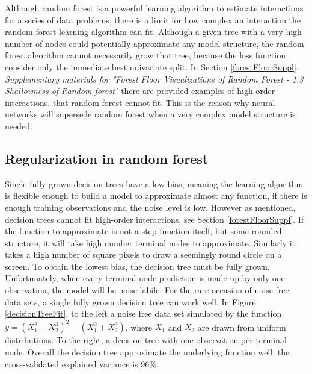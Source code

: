 Although random forest is a powerful learning algorithm to estimate interactions for a series of data problems, there is a limit for how complex an interaction the random forest learning algorithm can fit. Although a given tree with a very high number of nodes could potentially approximate any model structure, the random forest algorithm cannot necessarily grow that tree, because the loss function consider only the immediate best univariate split. In Section \ref{forestFloorSuppl}, \textit{Supplementary materials for "Forest Floor Visualizations of Random Forest - 1.3 Shallowness of Random forest"} there are provided examples of high-order interactions, that random forest cannot fit. This is the reason why neural networks will supersede random forest when a very complex model structure is needed.

\subsection{Regularization in random forest}
Single fully grown decision trees have a low bias, meaning the learning algorithm is flexible enough to build a model to approximate almost any function, if there is enough training observations and the noise level is low. However as mentioned, decision trees cannot fit high-order interactions, see Section \ref{forestFloorSuppl}. If the function to approximate is not a step function itself, but some rounded structure, it will take high number terminal nodes to approximate. Similarly it takes a high number of square pixels to draw a seemingly round circle on a screen. To obtain the lowest bias, the decision tree must be fully grown. Unfortunately, when every terminal node prediction is made up by only one observation, the model will be noise labile. For the rare occasion of noise free data sets, a single fully grown decision tree can work well. In Figure \ref{decisionTreeFit}, to the left a noise free data set simulated by the function $y=(X_1^2 + X_2^3)^2 - (X_1^2 + X_2^3)$, where $X_1$ and $X_2$ are drawn from uniform distributions. To the right, a decision tree with one observation per terminal node. Overall the decision tree approximate the underlying function well, the cross-validated explained variance is 96\%.

